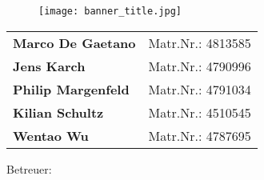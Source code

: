 \begin{titlepage}
 \centering

\begin{figure}[htbp]
 \begin{center}
  \vspace*{-4.0cm}
  \hspace*{-0.8cm}
  \texttt{[image: banner\_title.jpg]} 
 \end{center}
\end{figure}
 

 \vspace*{5.0cm}

 \textbf{\large {\Art}}


 \vspace*{1.2cm}
 
 \parbox[c]{\textwidth}{\centering \bfseries \LARGE \Titel}
 
\vspace*{7cm}
 
\begin{tabular}{ll}
\textbf{\large Marco De Gaetano}  & Matr.Nr.: 4813585 \\
\textbf{\large Jens Karch}        & Matr.Nr.: 4790996 \\
\textbf{\large Philip Margenfeld} & Matr.Nr.: 4791034 \\
\textbf{\large Kilian Schultz}    & Matr.Nr.: 4510545 \\
\textbf{\large Wentao Wu}         & Matr.Nr.: 4787695
\end{tabular}

 \vspace*{2.5cm}

  \begin{center}
	Betreuer: \Pruefer
  \end{center}

\end{titlepage}

